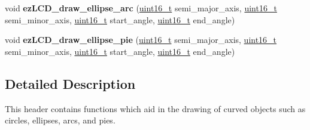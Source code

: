 \begin{DoxyCompactItemize}
\item 
\hypertarget{group__ez_l_c_d__103__curves_gadb130c86f4fdfbfdf52e2c62f7573713}{void {\bfseries ez\-L\-C\-D\-\_\-draw\-\_\-ellipse\-\_\-arc} (\hyperlink{group__ez_l_c_d__103__common_ga1f1825b69244eb3ad2c7165ddc99c956}{uint16\-\_\-t} semi\-\_\-major\-\_\-axis, \hyperlink{group__ez_l_c_d__103__common_ga1f1825b69244eb3ad2c7165ddc99c956}{uint16\-\_\-t} semi\-\_\-minor\-\_\-axis, \hyperlink{group__ez_l_c_d__103__common_ga1f1825b69244eb3ad2c7165ddc99c956}{uint16\-\_\-t} start\-\_\-angle, \hyperlink{group__ez_l_c_d__103__common_ga1f1825b69244eb3ad2c7165ddc99c956}{uint16\-\_\-t} end\-\_\-angle)}\label{group__ez_l_c_d__103__curves_gadb130c86f4fdfbfdf52e2c62f7573713}

\item 
\hypertarget{group__ez_l_c_d__103__curves_ga09740f0536e1277c63bf4ce73add2820}{void {\bfseries ez\-L\-C\-D\-\_\-draw\-\_\-ellipse\-\_\-pie} (\hyperlink{group__ez_l_c_d__103__common_ga1f1825b69244eb3ad2c7165ddc99c956}{uint16\-\_\-t} semi\-\_\-major\-\_\-axis, \hyperlink{group__ez_l_c_d__103__common_ga1f1825b69244eb3ad2c7165ddc99c956}{uint16\-\_\-t} semi\-\_\-minor\-\_\-axis, \hyperlink{group__ez_l_c_d__103__common_ga1f1825b69244eb3ad2c7165ddc99c956}{uint16\-\_\-t} start\-\_\-angle, \hyperlink{group__ez_l_c_d__103__common_ga1f1825b69244eb3ad2c7165ddc99c956}{uint16\-\_\-t} end\-\_\-angle)}\label{group__ez_l_c_d__103__curves_ga09740f0536e1277c63bf4ce73add2820}

\end{DoxyCompactItemize}


\subsection{Detailed Description}
This header contains functions which aid in the drawing of curved objects such as circles, ellipses, arcs, and pies. 

